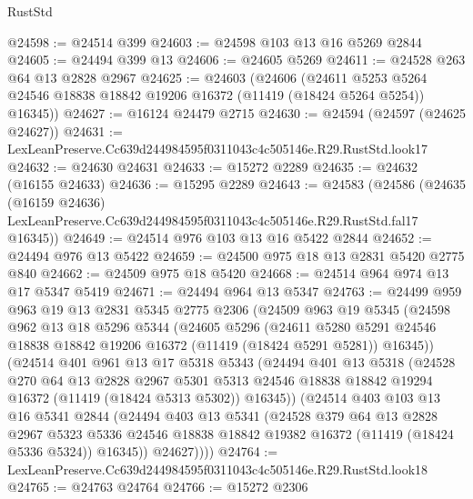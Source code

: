 \begin{lexlean}{RustStd}
\begin{coremodule}
@24598 := @24514 @399
@24603 := @24598 @103 @13 @16 @5269 @2844
@24605 := @24494 @399 @13
@24606 := @24605 @5269
@24611 := @24528 @263 @64 @13 @2828 @2967
@24625 := @24603
    (@24606
      (@24611 @5253 @5264 @24546 @18838 @18842 @19206 @16372 (@11419 (@18424 @5264 @5254)) @16345))
@24627 := @16124 @24479 @2715
@24630 := @24594 (@24597 (@24625 @24627))
@24631 := LexLeanPreserve.Cc639d244984595f0311043c4c505146e.R29.RustStd.look17
@24632 := @24630 @24631
@24633 := @15272 @2289
@24635 := @24632 (@16155 @24633)
@24636 := @15295 @2289
@24643 := @24583
    (@24586
      (@24635
        (@16159 @24636)
        LexLeanPreserve.Cc639d244984595f0311043c4c505146e.R29.RustStd.fal17
        @16345))
@24649 := @24514 @976 @103 @13 @16 @5422 @2844
@24652 := @24494 @976 @13 @5422
@24659 := @24500 @975 @18 @13 @2831 @5420 @2775 @840
@24662 := @24509 @975 @18 @5420
@24668 := @24514 @964 @974 @13 @17 @5347 @5419
@24671 := @24494 @964 @13 @5347
@24763 := @24499
    @959
    @963
    @19
    @13
    @2831
    @5345
    @2775
    @2306
    (@24509
      @963
      @19
      @5345
      (@24598
        @962
        @13
        @18
        @5296
        @5344
        (@24605
          @5296
          (@24611
            @5280
            @5291
            @24546
            @18838
            @18842
            @19206
            @16372
            (@11419 (@18424 @5291 @5281))
            @16345))
        (@24514
          @401
          @961
          @13
          @17
          @5318
          @5343
          (@24494
            @401
            @13
            @5318
            (@24528
              @270
              @64
              @13
              @2828
              @2967
              @5301
              @5313
              @24546
              @18838
              @18842
              @19294
              @16372
              (@11419 (@18424 @5313 @5302))
              @16345))
          (@24514
            @403
            @103
            @13
            @16
            @5341
            @2844
            (@24494
              @403
              @13
              @5341
              (@24528
                @379
                @64
                @13
                @2828
                @2967
                @5323
                @5336
                @24546
                @18838
                @18842
                @19382
                @16372
                (@11419 (@18424 @5336 @5324))
                @16345))
            @24627))))
@24764 := LexLeanPreserve.Cc639d244984595f0311043c4c505146e.R29.RustStd.look18
@24765 := @24763 @24764
@24766 := @15272 @2306

\end{coremodule}
\end{lexlean}
